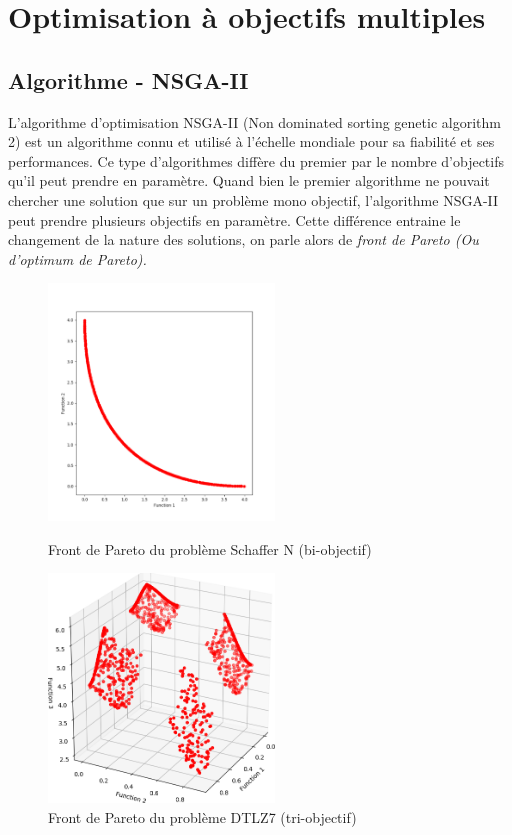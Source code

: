 \documentclass[12pt]{report}
\begin{document}
  \chapter{Optimisation à objectifs multiples}
    \section{Algorithme - NSGA-II}
    L'algorithme d'optimisation NSGA-II (Non dominated sorting genetic algorithm 2) est un algorithme connu et utilisé à l'échelle mondiale pour sa fiabilité et ses performances. Ce type d'algorithmes diffère du premier par le nombre d'objectifs qu'il peut prendre en paramètre. Quand bien le premier algorithme ne pouvait chercher une solution que sur un problème mono objectif, l'algorithme NSGA-II peut prendre plusieurs objectifs en paramètre. Cette différence entraine le changement de la nature des solutions, on parle alors de \emph{front de Pareto (Ou d'optimum de Pareto).}\\

    \begin{figure}[h]
      \begin{minipage}[c]{.46\linewidth}
          \centering
          \includegraphics[width=6cm]{img/4,1,1_Pareto_uni.png}
          \caption{Front de Pareto du problème Schaffer N \cite{wiki5} (bi-objectif)}
          \label{sch}
      \end{minipage}
      \hfill%
      \begin{minipage}[c]{.46\linewidth}
          \centering
          \includegraphics[width=6cm]{img/4,1,1_Pareto.png}
          \caption{Front de Pareto du problème DTLZ7 (tri-objectif)}
      \end{minipage}
    \end{figure}
\end{document}
